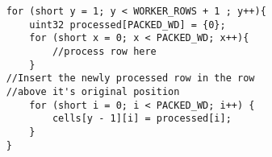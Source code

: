 \begin{minipage}{0.5\textwidth}
    \begin{verbatim}
    for (short y = 1; y < WORKER_ROWS + 1 ; y++){
        uint32 processed[PACKED_WD] = {0};
        for (short x = 0; x < PACKED_WD; x++){
            //process row here
        }
    //Insert the newly processed row in the row 
    //above it's original position
        for (short i = 0; i < PACKED_WD; i++) {
            cells[y - 1][i] = processed[i];
        }
    }
    \end{verbatim}
\end{minipage}
